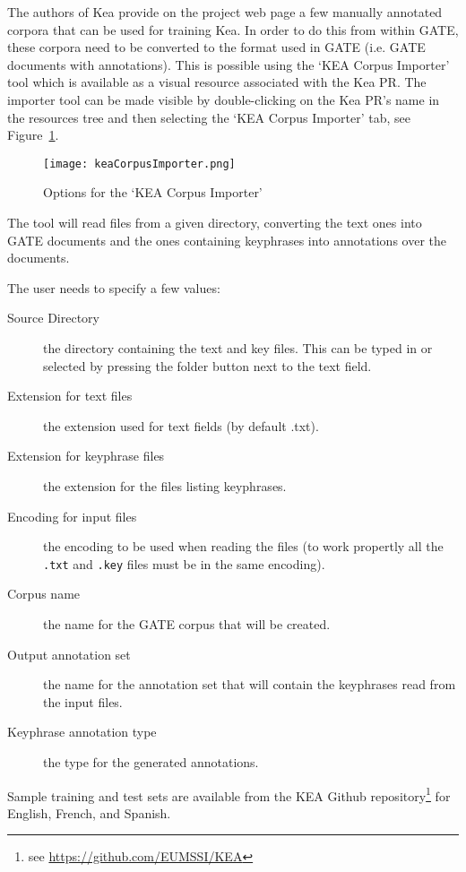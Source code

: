 
The authors of Kea provide on the project web page a few manually annotated
corpora that can be used for training Kea. In order to do this from within GATE,
these corpora need to be converted to the format used in GATE (i.e. GATE
documents with annotations). This is possible using the `KEA Corpus Importer'
tool which is available as a visual resource associated with the Kea PR. The
importer tool can be made visible by double-clicking on the Kea PR's name in the
resources tree and then selecting the `KEA Corpus Importer' tab, see
Figure~\ref{fig:keaImporter}.

\begin{figure}
\texttt{[image: keaCorpusImporter.png]}
\caption{Options for the `KEA Corpus Importer'}
\label{fig:keaImporter}
\end{figure}

The tool will read files from a given directory, converting the text ones into
GATE documents and the ones containing keyphrases into annotations over the
documents.

The user needs to specify a few values:
\begin{description}
\item[Source Directory] the directory containing the text and key files. This
can be typed in or selected by pressing the folder button next to the text
field.
\item[Extension for text files] the extension used for text fields (by default
.txt).
\item[Extension for keyphrase files] the extension for the files listing
keyphrases.
\item[Encoding for input files] the encoding to be used when reading the files
  (to work propertly all the \texttt{.txt} and \texttt{.key} files must be in
  the same encoding).
\item[Corpus name] the name for the GATE corpus that will be created.
\item[Output annotation set] the name for the annotation set that will contain
the keyphrases read from the input files.
\item[Keyphrase annotation type] the type for the generated annotations.
\end{description}

Sample training and test sets are available from the KEA Github
repository\footnote{see \url{https://github.com/EUMSSI/KEA}} for English,
French, and Spanish.
%


